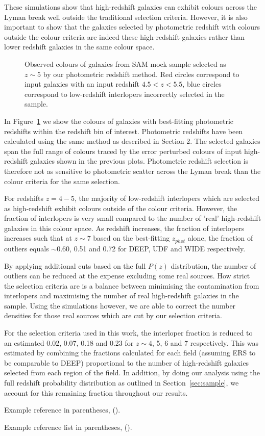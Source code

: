 These simulations show that high-redshift galaxies can exhibit colours across the Lyman break well outside the traditional selection criteria. However, it is also important to show that the galaxies selected by photometric redshift with colours outside the colour criteria are indeed these high-redshift galaxies rather than lower redshift galaxies  in the same colour space.

\begin{figure}
\centering
\caption{Observed colours of galaxies from SAM mock sample selected as $z \sim 5$ by our photometric redshift method. Red circles correspond to input galaxies with an input redshift $4.5 < z < 5.5$, blue circles correspond to low-redshift interlopers incorrectly selected in the sample.}
\label{fig:mock_col_photz}
\end{figure}

In Figure~\ref{fig:mock_col_photz} we show the colours of galaxies with best-fitting photometric redshifts within the redshift bin of interest. Photometric redshifts have been calculated using the same method as described in Section 2. The selected galaxies span the full range of colours traced by the error perturbed colours of input high-redshift galaxies shown in the previous plots. Photometric redshift selection is therefore not as sensitive to photometric scatter across the Lyman break than the colour criteria for the same selection.

For redshifts $z = 4 - 5$, the majority of low-redshift interlopers which are selected as high-redshift exhibit colours outside of the colour criteria. However, the fraction of interlopers is very small compared to the number of 'real' high-redshift galaxies in this colour space. As redshift increases, the fraction of interlopers increases such that at $z \sim 7$ based on the best-fitting $z_{phot}$ alone, the fraction of outliers equals $\sim 0.60$, 0.51 and 0.72 for DEEP, UDF and WIDE respectively.

By applying additional cuts based on the full $P(z)$ distribution, the number of outliers can be reduced at the expense excluding some real sources. How strict the selection criteria are is a balance between minimising the contamination from interlopers and maximising the number of real high-redshift galaxies in the sample. Using the simulations however, we are able to correct the number densities for those real sources which are cut by our selection criteria.

For the selection criteria used in this work, the interloper fraction is reduced to an estimated 0.02, 0.07, 0.18 and 0.23 for $z \sim 4$, 5, 6 and 7 respectively. This was estimated by combining the fractions calculated for each field (assuming ERS to be comparable to DEEP) proportional to the number of high-redshift galaxies selected from each region of the field. In addition, by doing our analysis using the full redshift probability distribution as outlined in Section~\ref{sec:sample}, we account for this remaining fraction throughout our results.


Example reference in parentheses, (\citealt{ref1}).

Example reference list in parentheses, (\citealt{ref1,ref2}).



